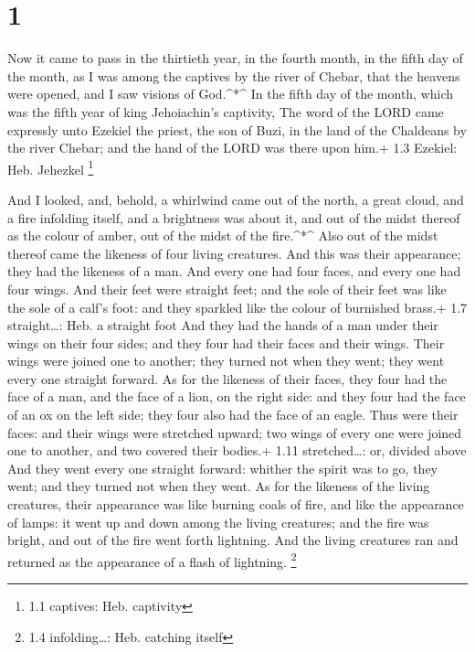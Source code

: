 \hypertarget{section}{%
\section{1}\label{section}}

 Now it came to pass in the thirtieth year, in the fourth
month, in the fifth day of the month, as I was among the captives by the
river of Chebar, that the heavens were opened, and I saw visions of
God.\^{}*\^{}  In the fifth day of the month, which was the
fifth year of king Jehoiachin's captivity,  The word of the
LORD came expressly unto Ezekiel the priest, the son of Buzi, in the
land of the Chaldeans by the river Chebar; and the hand of the LORD was
there upon him.+ 1.3 Ezekiel: Heb. Jehezkel \footnote{1.1 captives: Heb.
  captivity}

 And I looked, and, behold, a whirlwind came out of the
north, a great cloud, and a fire infolding itself, and a brightness was
about it, and out of the midst thereof as the colour of amber, out of
the midst of the fire.\^{}*\^{}  Also out of the midst
thereof came the likeness of four living creatures. And this was their
appearance; they had the likeness of a man.  And every one
had four faces, and every one had four wings.  And their
feet were straight feet; and the sole of their feet was like the sole of
a calf's foot: and they sparkled like the colour of burnished brass.+
1.7 straight\ldots: Heb. a straight foot  And they had the
hands of a man under their wings on their four sides; and they four had
their faces and their wings.  Their wings were joined one to
another; they turned not when they went; they went every one straight
forward.  As for the likeness of their faces, they four had
the face of a man, and the face of a lion, on the right side: and they
four had the face of an ox on the left side; they four also had the face
of an eagle.  Thus were their faces: and their wings were
stretched upward; two wings of every one were joined one to another, and
two covered their bodies.+ 1.11 stretched\ldots: or, divided above
 And they went every one straight forward: whither the
spirit was to go, they went; and they turned not when they went.
 As for the likeness of the living creatures, their
appearance was like burning coals of fire, and like the appearance of
lamps: it went up and down among the living creatures; and the fire was
bright, and out of the fire went forth lightning.  And the
living creatures ran and returned as the appearance of a flash of
lightning. \footnote{1.4 infolding\ldots: Heb. catching itself}

